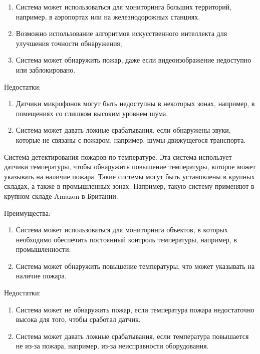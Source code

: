 \begin{multicols}{2}
\begin{enumerate}
\def\labelenumi{\arabic{enumi}.}
\item
  Система может использоваться для мониторинга больших территорий,
  например, в аэропортах или на железнодорожных станциях.
\item
  Возможно использование алгоритмов искусственного интеллекта для
  улучшения точности обнаружения;
\item
  Система может обнаружить пожар, даже если видеоизображение недоступно
  или заблокировано.
\end{enumerate}

Недостатки:

\begin{enumerate}
\def\labelenumi{\arabic{enumi}.}
\item
  Датчики микрофонов могут быть недоступны в некоторых зонах, например,
  в помещениях со слишком высоким уровнем шума.
\item
  Система может давать ложные срабатывания, если обнаружены звуки,
  которые не связаны с пожаром, например, шумы движущегося транспорта.
\end{enumerate}

Система детектирования пожаров по температуре. Эта система использует
датчики температуры, чтобы обнаружить повышение температуры, которое
может указывать на наличие пожара. Такие системы могут быть установлены
в крупных складах, а также в промышленных зонах. Например, такую систему
применяют в крупном складе Amazon в Британии.

Преимущества:

\begin{enumerate}
\def\labelenumi{\arabic{enumi}.}
\item
  Система может использоваться для мониторинга объектов, в которых
  необходимо обеспечить постоянный контроль температуры, например, в
  промышленности.
\item
  Система может обнаружить повышение температуры, что может указывать на
  наличие пожара.
\end{enumerate}

Недостатки:

\begin{enumerate}
\def\labelenumi{\arabic{enumi}.}
\item
  Система может не обнаружить пожар, если температура пожара
  недостаточно высока для того, чтобы сработал датчик.
\item
  Система может давать ложные срабатывания, если температура повышается
  не из-за пожара, например, из-за неисправности оборудования.
\end{enumerate}


\end{multicols}
